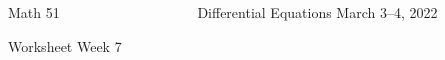\documentclass[12pt]{article}
\begin{document}

\noindent
Math 51~~~~~~~~~~~~~~~~~~~ \hfill Differential Equations \hfill March 3--4, 2022 
 \centerline{Worksheet Week 7}

\end{document}
